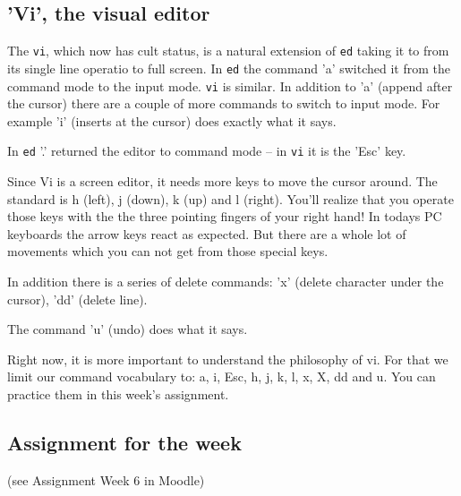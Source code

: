 \documentclass[11pt,a4paper,twoside]{article}
\begin{document}
\subsection{'Vi', the visual editor}

The \texttt{vi}, which now has cult status, is a natural extension of 
\texttt{ed} taking it to from its single line operatio to full screen. 
In \texttt{ed} the command 'a' switched it from the command mode to the 
input mode. \texttt{vi} is similar. In addition to 'a' (append after 
the cursor) there are a couple of more commands to switch to input mode. 
For example 'i' (inserts at the cursor) does exactly what it says.

In \texttt{ed} '.' returned the editor to command mode -- in \texttt{vi}
it is the 'Esc' key.

Since Vi is a screen editor, it needs more keys to move the cursor around. 
The standard is h (left), j (down), k (up) and l (right). You'll realize
that you operate those keys with the the three pointing fingers of your
right hand! In todays PC keyboards the arrow keys react as expected. But 
there are a whole lot of movements which you can not get from those 
special keys.

In addition there is a series of delete commands: 'x' (delete character
under the cursor), 'dd' (delete line). 

The command 'u' (undo) does what it says.

Right now, it is more important to understand the philosophy of vi. For
that we limit our command vocabulary to: a, i, Esc, h, j, k, l, x, X,
dd and u.  You can practice them in this week's assignment.

\subsection{Assignment for the week}
(see Assignment Week 6 in Moodle)
%
%
%
%
\end{document}
